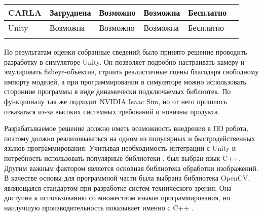 \begin{table}[]
\begin{tabular}{|l|l|l|l|l|l|}
    CARLA             & Затруднена                                                                  & Возможно                                                                       & Возможна                                                            & Бесплатно            &                     \\ \hline
    Unity             & Возможна                                                                    & Возможно                                                                       & Возможна                                                            & Бесплатно            &                     \\ \hline
                      &                                                                             &                                                                                &                                                                     &                      &                     \\ \hline
    \end{tabular}
\end{table}

По результатам оценки собранные сведений было принято решение проводить разработку в симуляторе Unity. Он позволяет подробно настраивать камеру и эмулировать fisheye-объектив, 
строить реалистичные сцены благодаря свободному импорту моделей, а при программировании в симуляторе можно использовать сторонние программы в виде динамически подключаемых библиотек. 
По функционалу так же подходит NVIDIA Isaac Sim, но от него пришлось отказаться из-за высоких системных требований и новизны продукта.     %

Разрабатываемое решение должно иметь возможность внедрения в ПО робота, %
поэтому должно реализовываться на одном из популярных и быстродейственных языков программирования. Учитывая необходимость интеграции с Unity и потребность использовать популярные библиотеки
, был выбран язык C++.  Другим важным фактором является основная библиотека обработки изображений. В качестве основы для программной части была выбрана библиотека OpenCV, являющаяся стандартом 
при разработке систем технического зрения. Она доступна к использованию со множеством языков программирования, но наилучшую производительность показывает именно с C++ \cite{}.                              %